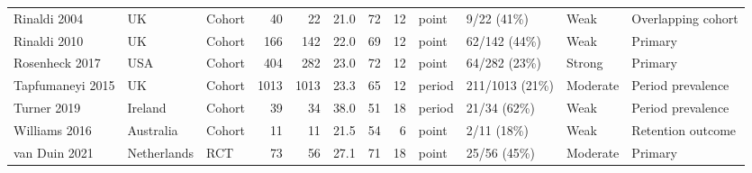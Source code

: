 \begin{tabular}{lllrrllrllll}
Rinaldi 2004 & UK & Cohort & 40 & 22 & 21.0 & 72 & 12 & point & 9/22 (41\%) & Weak & Overlapping cohort\\
Rinaldi 2010 & UK & Cohort & 166 & 142 & 22.0 & 69 & 12 & point & 62/142 (44\%) & Weak & Primary\\
Rosenheck 2017 & USA & Cohort & 404 & 282 & 23.0 & 72 & 12 & point & 64/282 (23\%) & Strong & Primary\\
Tapfumaneyi 2015 & UK & Cohort & 1013 & 1013 & 23.3 & 65 & 12 & period & 211/1013 (21\%) & Moderate & Period prevalence\\
Turner 2019 & Ireland & Cohort & 39 & 34 & 38.0 & 51 & 18 & period & 21/34 (62\%) & Weak & Period prevalence\\
Williams 2016 & Australia & Cohort & 11 & 11 & 21.5 & 54 & 6 & point & 2/11 (18\%) & Weak & Retention outcome\\
van Duin 2021 & Netherlands & RCT & 73 & 56 & 27.1 & 71 & 18 & point & 25/56 (45\%) & Moderate & Primary\\
\bottomrule
\end{tabular}
